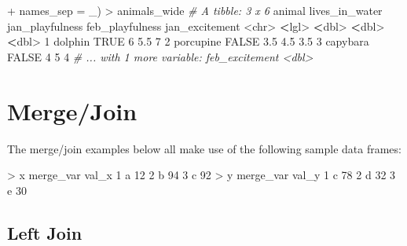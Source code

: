 \documentclass[
]{book}
\newenvironment{Shaded}{\begin{snugshade}}{\end{snugshade}}
\newcommand{\AttributeTok}[1]{\textcolor[rgb]{0.77,0.63,0.00}{#1}}
\newcommand{\CommentTok}[1]{\textcolor[rgb]{0.56,0.35,0.01}{\textit{#1}}}
\newcommand{\ConstantTok}[1]{\textcolor[rgb]{0.00,0.00,0.00}{#1}}
\newcommand{\DecValTok}[1]{\textcolor[rgb]{0.00,0.00,0.81}{#1}}
\newcommand{\ErrorTok}[1]{\textcolor[rgb]{0.64,0.00,0.00}{\textbf{#1}}}
\newcommand{\FloatTok}[1]{\textcolor[rgb]{0.00,0.00,0.81}{#1}}
\newcommand{\NormalTok}[1]{#1}
\newcommand{\SpecialCharTok}[1]{\textcolor[rgb]{0.00,0.00,0.00}{#1}}
\newcommand{\StringTok}[1]{\textcolor[rgb]{0.31,0.60,0.02}{#1}}
\begin{document}
\begin{Shaded}
\begin{Highlighting}[]
\SpecialCharTok{+}                             \AttributeTok{names\_sep =} \StringTok{\textquotesingle{}\_\textquotesingle{}}\NormalTok{)}
\SpecialCharTok{\textgreater{}}\NormalTok{ animals\_wide}
\CommentTok{\# A tibble: 3 x 6}
\NormalTok{  animal    lives\_in\_water jan\_playfulness feb\_playfulness jan\_excitement}
  \SpecialCharTok{\textless{}}\NormalTok{chr}\SpecialCharTok{\textgreater{}}     \ErrorTok{\textless{}}\NormalTok{lgl}\SpecialCharTok{\textgreater{}}                    \ErrorTok{\textless{}}\NormalTok{dbl}\SpecialCharTok{\textgreater{}}           \ErrorTok{\textless{}}\NormalTok{dbl}\SpecialCharTok{\textgreater{}}          \ErrorTok{\textless{}}\NormalTok{dbl}\SpecialCharTok{\textgreater{}}
\DecValTok{1}\NormalTok{ dolphin   }\ConstantTok{TRUE}                       \DecValTok{6}               \FloatTok{5.5}            \DecValTok{7}  
\DecValTok{2}\NormalTok{ porcupine }\ConstantTok{FALSE}                      \FloatTok{3.5}             \FloatTok{4.5}            \FloatTok{3.5}
\DecValTok{3}\NormalTok{ capybara  }\ConstantTok{FALSE}                      \DecValTok{4}               \DecValTok{5}              \DecValTok{4}  
\CommentTok{\# ... with 1 more variable: feb\_excitement \textless{}dbl\textgreater{}}
\end{Highlighting}
\end{Shaded}

\hypertarget{mergejoin}{%
\section{Merge/Join}\label{mergejoin}}

The merge/join examples below all make use of the following sample data frames:

\begin{Shaded}
\begin{Highlighting}[]
\SpecialCharTok{\textgreater{}}\NormalTok{ x}
\NormalTok{  merge\_var val\_x}
\DecValTok{1}\NormalTok{         a    }\DecValTok{12}
\DecValTok{2}\NormalTok{         b    }\DecValTok{94}
\DecValTok{3}\NormalTok{         c    }\DecValTok{92}
\SpecialCharTok{\textgreater{}}\NormalTok{ y}
\NormalTok{  merge\_var val\_y}
\DecValTok{1}\NormalTok{         c    }\DecValTok{78}
\DecValTok{2}\NormalTok{         d    }\DecValTok{32}
\DecValTok{3}\NormalTok{         e    }\DecValTok{30}
\end{Highlighting}
\end{Shaded}

\hypertarget{left-join}{%
\subsection{Left Join}\label{left-join}}
\end{document}
